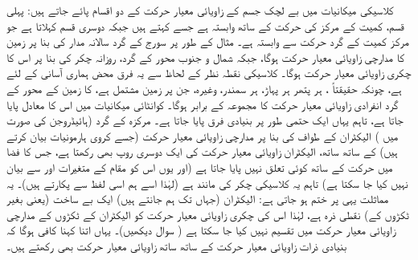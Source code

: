 کلاسیکی میکانیات میں بے لچک جسم کے زاویائی معیار حرکت کے دو اقسام پائے جاتے ہیں:  پہلی قسم،   کمیت کے مرکز کی  حرکت کے ساتھ وابستہ ہے جسے     کہتے ہیں جبکہ دوسری  قسم   
  کہلاتا ہے  جو مرکز کمیت کے گرد حرکت سے وابستہ ہے۔ مثال کے طور پر سورج کے گرد سالانہ مدار کی بنا پر زمین کا مدارچی زاویائی معیار حرکت ہوگا، جبکہ شمال و  جنوب محور کے گرد، روزانہ چکر کی بنا پر اس کا چکری زاویائی معیار حرکت ہوگا۔  کلاسیکی  نقطہ نظر کے لحاظ سے  یہ فرق  محض ہماری آسانی کے لئے ہے،  چونکہ حقیقتاً ،  ہر پتھر ہر پہاڑ، ہر سمندر،  وغیرہ،  جن پر زمین مشتمل ہے،  کا زمین کے محور کے گرد انفرادی  زاویائی معیار حرکت کا مجموعہ   کے برابر ہوگا۔  کوانٹائی میکانیات میں اس کا معادل پایا جاتا ہے، تاہم  یہاں ایک حتمی  طور پر  بنیادی فرق پایا جاتا ہے۔ مرکزہ کے گرد  (ہائیڈروجن کی صورت میں )  الیکٹران کے  طواف کی بنا پر مدارچی زاویائی معیار حرکت (جسے کروی ہارمونیات بیان کرتے ہیں) کے ساتھ ساتھ،  الیکٹران زاویائی معیار حرکت کی ایک دوسری روپ بھی رکھتا ہے، جس کا فضا میں حرکت کے ساتھ کوئی تعلق نہیں پایا جاتا ہے (اور یوں  اس کو مقام کے متغیرات   اور  سے بیان نہیں کیا جا سکتا ہے) تاہم   یہ کلاسیکی چکر کی مانند ہے (لہٰذا اسے ہم اسی لفظ سے پکارتے ہیں)۔  یہ مماثلت یہی پر ختم ہو جاتی ہے:   الیکٹران (جہاں تک ہم جانتے ہیں) ایک   بے ساخت (یعنی بغیر ٹکڑوں کے)   نقطی ذرہ ہے،  لہٰذا اس کی چکری زاویائی معیار حرکت کو الیکٹران  کے ٹکڑوں کے  مدارچی زاویائی معیار حرکت   میں تقسیم نہیں کیا  جا سکتا ہے ( سوال  دیکھیں)۔   یہاں اتنا کہنا کافی ہوگا کہ بنیادی ذرات    زاویائی معیار حرکت  کے ساتھ ساتھ     زاویائی معیار حرکت  بھی رکھتے ہیں۔

